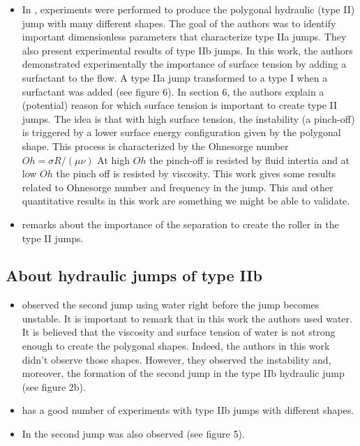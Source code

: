 \documentclass[english,11pt]{article}
\let\cite=\citet
\numberwithin{remark}{subsection}
\begin{document}
\begin{itemize}
\item In \cite{bush2006experimental}, experiments were performed to produce the polygonal hydraulic
  (type II) jump with many different shapes.
  The goal of the authors was to identify important dimensionless parameters that characterize type IIa jumps. They
  also present experimental results of type IIb jumps.
  In this work, the authors demonstrated experimentally the importance of surface tension by adding a surfactant to the flow.
  A type IIa jump transformed to a type I when a surfactant was added (see figure 6).
  In section 6, the authors explain a (potential) reason for which surface tension is important to create type II jumps.
  The idea is that with high surface tension, the instability (a pinch-off) is triggered by a lower surface energy configuration
  given by the polygonal shape.
  This process is characterized by the Ohnesorge number $Oh=\sigma R/(\mu\nu)$
  At high $Oh$ the pinch-off is resisted by fluid intertia and at low $Oh$ the pinch off is resisted by viscosity.
  This work gives some results related to Ohnesorge number and frequency in the jump.
  This and other quantitative results in this work are something we might be able to validate.

\item \cite{andersen2010separation} remarks about the importance of the separation to create the roller in the type II jumps.
  
\end{itemize}

\subsection{About hydraulic jumps of type IIb}
\begin{itemize}
\item \cite{craik1981circular} observed the second jump using water right before the jump becomes unstable.
  It is important to remark that in this work the authors used water. It is believed that the viscosity and surface tension
  of water is not strong enough to create the polygonal shapes. Indeed, the authors in this work didn't observe those shapes.
  However, they observed the instability and, moreover, the formation of the second jump in the type IIb hydraulic jump
  (see figure 2b). 
  
\item \cite{bush2006experimental} has a good number of experiments with type IIb jumps with different shapes.

\item In \cite{liu1993hydraulic} the second jump was also observed (see figure 5).
  
\end{itemize}
\end{document}
